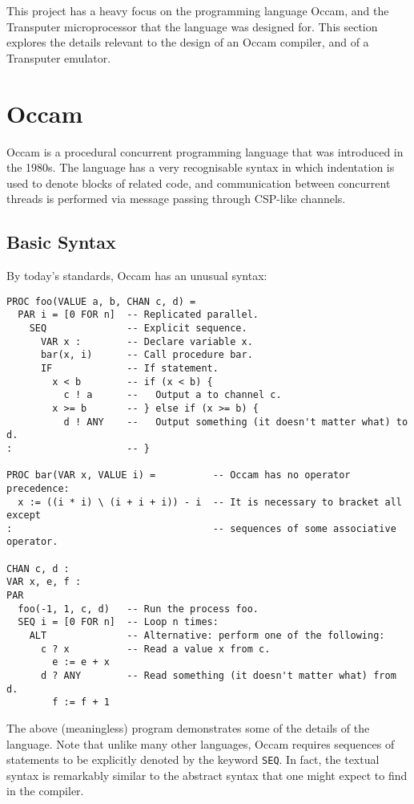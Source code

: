 This project has a heavy focus on the programming language Occam, and the
Transputer microprocessor that the language was designed for. This section
explores the details relevant to the design of an Occam compiler, and of a
Transputer emulator.

\section{Occam}

Occam is a procedural concurrent programming language that was introduced in the
1980s. The language has a very recognisable syntax in which indentation is used
to denote blocks of related code, and communication between concurrent threads
is performed via message passing through CSP-like channels.

\subsection{Basic Syntax}

By today's standards, Occam has an unusual syntax:

\begin{lstlisting}[language=occam]
PROC foo(VALUE a, b, CHAN c, d) =
  PAR i = [0 FOR n]  -- Replicated parallel.
    SEQ              -- Explicit sequence.
      VAR x :        -- Declare variable x.
      bar(x, i)      -- Call procedure bar.
      IF             -- If statement.
        x < b        -- if (x < b) {
          c ! a      --   Output a to channel c.
        x >= b       -- } else if (x >= b) {
          d ! ANY    --   Output something (it doesn't matter what) to d.
:                    -- }

PROC bar(VAR x, VALUE i) =          -- Occam has no operator precedence:
  x := ((i * i) \ (i + i + i)) - i  -- It is necessary to bracket all except
:                                   -- sequences of some associative operator.

CHAN c, d :
VAR x, e, f :
PAR
  foo(-1, 1, c, d)   -- Run the process foo.
  SEQ i = [0 FOR n]  -- Loop n times:
    ALT              -- Alternative: perform one of the following:
      c ? x          -- Read a value x from c.
        e := e + x
      d ? ANY        -- Read something (it doesn't matter what) from d.
        f := f + 1
\end{lstlisting}

The above (meaningless) program demonstrates some of the details of the
language. Note that unlike many other languages, Occam requires sequences of
statements to be explicitly denoted by the keyword \texttt{SEQ}. In fact, the
textual syntax is remarkably similar to the abstract syntax that one might
expect to find in the compiler.

